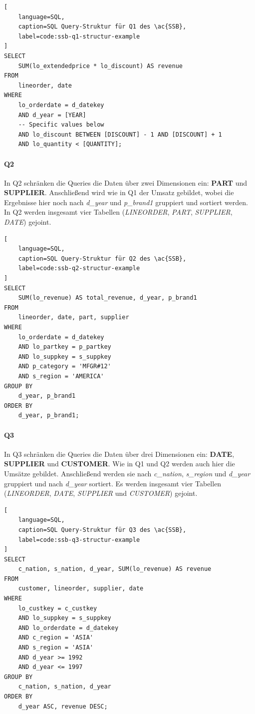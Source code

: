 \begin{lstlisting}[
    language=SQL,
    caption=SQL Query-Struktur für Q1 des \ac{SSB},
    label=code:ssb-q1-structur-example
]
SELECT 
    SUM(lo_extendedprice * lo_discount) AS revenue
FROM 
    lineorder, date
WHERE 
    lo_orderdate = d_datekey
    AND d_year = [YEAR]
    -- Specific values below
    AND lo_discount BETWEEN [DISCOUNT] - 1 AND [DISCOUNT] + 1
    AND lo_quantity < [QUANTITY];
\end{lstlisting}

\paragraph{Q2}
In Q2 schränken die Queries die Daten über zwei Dimensionen ein: \textbf{PART} und \textbf{SUPPLIER}.
Anschließend wird wie in Q1 der Umsatz gebildet, wobei die Ergebnisse hier noch nach \emph{d\_year} und \emph{p\_brand1} gruppiert und sortiert werden.  
In Q2 werden insgesamt vier Tabellen (\emph{LINEORDER}, \emph{PART}, \emph{SUPPLIER}, \emph{DATE}) gejoint.
\begin{lstlisting}[
    language=SQL,
    caption=SQL Query-Struktur für Q2 des \ac{SSB},
    label=code:ssb-q2-structur-example
]
SELECT 
    SUM(lo_revenue) AS total_revenue, d_year, p_brand1
FROM 
    lineorder, date, part, supplier
WHERE 
    lo_orderdate = d_datekey
    AND lo_partkey = p_partkey
    AND lo_suppkey = s_suppkey
    AND p_category = 'MFGR#12'
    AND s_region = 'AMERICA'
GROUP BY 
    d_year, p_brand1
ORDER BY 
    d_year, p_brand1;

\end{lstlisting}

\paragraph{Q3}
In Q3 schränken die Queries die Daten über drei Dimensionen ein: \textbf{DATE}, \textbf{SUPPLIER} und \textbf{CUSTOMER}.
Wie in Q1 und Q2 werden auch hier die Umsätze gebildet.
Anschließend werden sie nach \emph{c\_nation}, \emph{s\_region} und \emph{d\_year} gruppiert und nach \emph{d\_year} sortiert.
Es werden insgesamt vier Tabellen (\emph{LINEORDER}, \emph{DATE}, \emph{SUPPLIER} und \emph{CUSTOMER}) gejoint.
\begin{lstlisting}[
    language=SQL,
    caption=SQL Query-Struktur für Q3 des \ac{SSB},
    label=code:ssb-q3-structur-example
]
SELECT 
    c_nation, s_nation, d_year, SUM(lo_revenue) AS revenue
FROM 
    customer, lineorder, supplier, date
WHERE 
    lo_custkey = c_custkey
    AND lo_suppkey = s_suppkey
    AND lo_orderdate = d_datekey
    AND c_region = 'ASIA'
    AND s_region = 'ASIA'
    AND d_year >= 1992
    AND d_year <= 1997
GROUP BY 
    c_nation, s_nation, d_year
ORDER BY 
    d_year ASC, revenue DESC;
\end{lstlisting}


